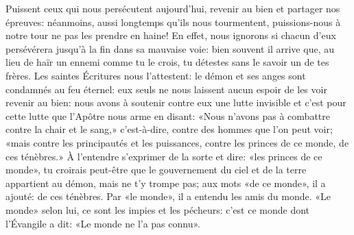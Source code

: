 Puissent ceux qui nous persécutent aujourd’hui,
	revenir au bien et partager nos épreuves:
	néanmoins, aussi longtemps qu’ils nous tourmentent,
	puissions-nous à notre tour ne pas les prendre en haine!
En effet, nous ignorons si chacun d’eux
		persévérera jusqu’à la fin dans sa mauvaise voie:
	bien souvent il arrive que, au lieu de haïr un ennemi comme tu le crois,
	tu détestes sans le savoir un de tes frères.
Les saintes Écritures nous l’attestent:
	le démon et ses anges sont condamnés au feu éternel:
	eux seuls ne nous laissent aucun espoir de les voir revenir au bien:
	nous avons à soutenir contre eux une lutte invisible
	et c’est pour cette lutte que l’Apôtre nous arme en disant:
	«Nous n’avons pas à combattre contre la chair et le sang,»
	c’est-à-dire, contre des hommes que l’on peut voir;
	«mais contre les principautés et les puissances,
	contre les princes de ce monde, de ces ténèbres.»
À l’entendre s’exprimer de la sorte et dire: «les princes de ce monde»,
	tu croirais peut-être
		que le gouvernement du ciel et de la terre appartient au démon,
	mais ne t’y trompe pas;
	aux mots «de ce monde», il a ajouté: de ces ténèbres.
Par «le monde», il a entendu les amis du monde.
«Le monde» selon lui, ce sont les impies et les pécheurs:
	c’est ce monde dont l’Évangile a dit: «Le monde ne l’a pas connu».
